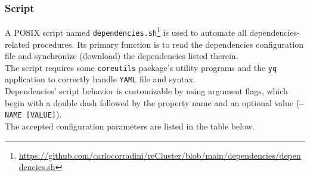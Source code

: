 \subsubsection{Script}
\label{subsec:implementation_dependencies_management_script}

A POSIX script named \texttt{dependencies.sh}\footnote{\url{https://github.com/carlocorradini/reCluster/blob/main/dependencies/dependencies.sh}}
is used to automate all dependencies-related procedures. Its primary function is
to read the dependencies configuration file and synchronize (download) the dependencies
listed therein. \\ %
The script requires some \texttt{coreutils} package's utility programs and the
\texttt{yq} application to correctly handle \texttt{YAML} file and syntax. \\ %
Dependencies' script behavior is customizable by using argument flags, which
begin with a double dash followed by the property name and an optional value (\texttt{--NAME
[VALUE]}). \\ %
The accepted configuration parameters are listed in the table below.

